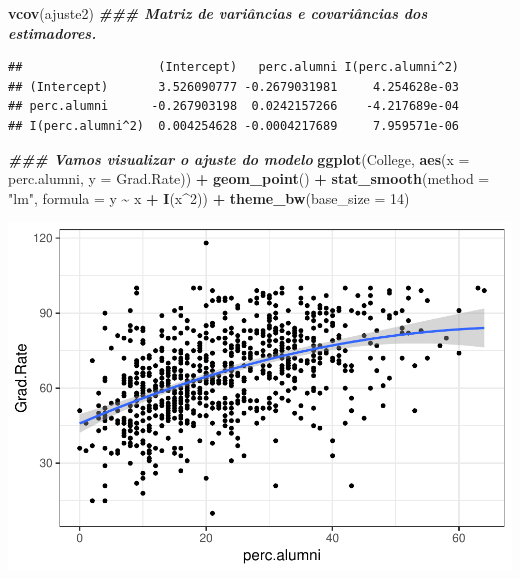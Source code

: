 \documentclass[
]{article}
\newenvironment{Shaded}{\begin{snugshade}}{\end{snugshade}}
\newcommand{\AttributeTok}[1]{\textcolor[rgb]{0.13,0.29,0.53}{#1}}
\newcommand{\DecValTok}[1]{\textcolor[rgb]{0.00,0.00,0.81}{#1}}
\newcommand{\DocumentationTok}[1]{\textcolor[rgb]{0.56,0.35,0.01}{\textbf{\textit{#1}}}}
\newcommand{\FunctionTok}[1]{\textcolor[rgb]{0.13,0.29,0.53}{\textbf{#1}}}
\newcommand{\NormalTok}[1]{#1}
\newcommand{\SpecialCharTok}[1]{\textcolor[rgb]{0.81,0.36,0.00}{\textbf{#1}}}
\newcommand{\StringTok}[1]{\textcolor[rgb]{0.31,0.60,0.02}{#1}}
\begin{document}
\begin{Shaded}
\begin{Highlighting}[]
\FunctionTok{vcov}\NormalTok{(ajuste2) }\DocumentationTok{\#\#\# Matriz de variâncias e covariâncias dos estimadores.}
\end{Highlighting}
\end{Shaded}

\begin{verbatim}
##                   (Intercept)   perc.alumni I(perc.alumni^2)
## (Intercept)       3.526090777 -0.2679031981     4.254628e-03
## perc.alumni      -0.267903198  0.0242157266    -4.217689e-04
## I(perc.alumni^2)  0.004254628 -0.0004217689     7.959571e-06
\end{verbatim}

\begin{Shaded}
\begin{Highlighting}[]
\DocumentationTok{\#\#\# Vamos visualizar o ajuste do modelo}
\FunctionTok{ggplot}\NormalTok{(College, }\FunctionTok{aes}\NormalTok{(}\AttributeTok{x =}\NormalTok{ perc.alumni, }\AttributeTok{y =}\NormalTok{ Grad.Rate)) }\SpecialCharTok{+} \FunctionTok{geom\_point}\NormalTok{() }\SpecialCharTok{+}
    \FunctionTok{stat\_smooth}\NormalTok{(}\AttributeTok{method =} \StringTok{"lm"}\NormalTok{, }\AttributeTok{formula =}\NormalTok{ y }\SpecialCharTok{\textasciitilde{}}\NormalTok{ x }\SpecialCharTok{+} \FunctionTok{I}\NormalTok{(x}\SpecialCharTok{\^{}}\DecValTok{2}\NormalTok{)) }\SpecialCharTok{+}
    \FunctionTok{theme\_bw}\NormalTok{(}\AttributeTok{base\_size =} \DecValTok{14}\NormalTok{)}
\end{Highlighting}
\end{Shaded}

\includegraphics{Modelos_Estatisticos-2024-08-10_files/figure-latex/unnamed-chunk-24-1.pdf}
\end{document}

